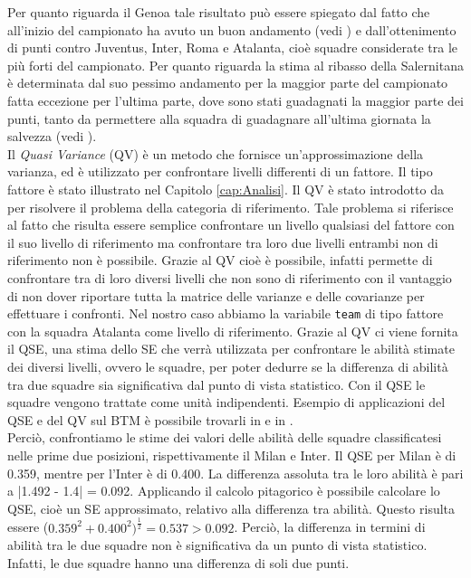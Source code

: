 Per quanto riguarda il Genoa tale risultato può essere spiegato dal fatto che all'inizio del campionato ha avuto un buon andamento (vedi \textit{\cite{storyGenoa}}) e dall'ottenimento di punti contro Juventus, Inter, Roma e Atalanta, cioè squadre considerate tra le più forti del campionato. Per quanto riguarda la stima al ribasso della Salernitana è determinata dal suo pessimo andamento per la maggior parte del campionato fatta eccezione per l'ultima parte, dove sono stati guadagnati la maggior parte dei punti, tanto da permettere alla squadra di guadagnare all'ultima giornata la salvezza (vedi \textit{\cite{storySal}}). \\
Il \emph{Quasi Variance} (QV)\autocite{firth2004quasi} è un metodo che fornisce un'approssimazione della varianza, ed è utilizzato per confrontare livelli differenti di un fattore. Il tipo fattore è stato illustrato nel Capitolo \ref{cap:Analisi}. Il QV è stato introdotto da \textcite{firth2004quasi} per risolvere il problema della categoria di riferimento. Tale problema si riferisce al fatto che risulta essere semplice confrontare un livello qualsiasi del fattore con il suo livello di riferimento ma confrontare tra loro due livelli entrambi non di riferimento non è possibile. Grazie al QV cioè è possibile, infatti permette di confrontare tra di loro diversi livelli che non sono di riferimento con il vantaggio di non dover riportare tutta la matrice delle varianze e delle covarianze per effettuare i confronti. Nel nostro caso abbiamo la variabile \texttt{team} di tipo fattore con la squadra Atalanta come livello di riferimento. Grazie al QV ci viene fornita il QSE, una stima dello SE che verrà utilizzata per confrontare le abilità stimate dei diversi livelli, ovvero le squadre, per poter dedurre se la differenza di abilità tra due squadre sia significativa dal punto di vista statistico. Con il QSE le squadre vengono trattate come unità indipendenti. Esempio di applicazioni del QSE e del QV sul BTM è possibile trovarli in \textcite{firth2004quasi} e in \textcite{turner2012bradley}.\\
Perciò, confrontiamo le stime dei valori delle abilità delle squadre classificatesi nelle prime due posizioni, rispettivamente il Milan e Inter. Il QSE per Milan è di 0.359, mentre per l'Inter è di 0.400. La differenza assoluta tra le loro abilità è pari a |1.492 - 1.4| = 0.092. Applicando il calcolo pitagorico è possibile calcolare lo QSE, cioè un SE approssimato, relativo alla differenza tra abilità. Questo risulta essere ($0.359^2 + 0.400^2)^\frac{1}{2}=0.537 > 0.092$. Perciò, la differenza in termini di abilità tra le due squadre non è significativa da un punto di vista statistico. Infatti, le due squadre hanno una differenza di soli due punti.

